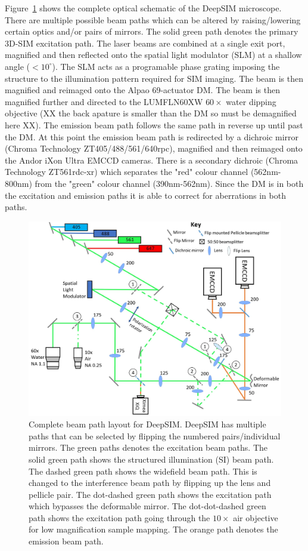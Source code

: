 Figure~\ref{fig:DeepSIM_complete_beam_paths} shows the complete
optical schematic of the DeepSIM microscope. There are multiple
possible beam paths which can be altered by raising/lowering certain
optics and/or pairs of mirrors. The solid green path denotes the
primary 3D-SIM excitation path. The laser beams are combined at a
single exit port, magnified and then reflected onto the spatial light
modulator (SLM) at a shallow angle ($<10^{\circ}$). The SLM acts as a
programable phase grating imposing the structure to the illumination
pattern required for SIM imaging. The beam is then magnified and
reimaged onto the Alpao 69-actuator DM. The beam is then magnified
further and directed to the LUMFLN60XW $60\times$ water dipping
objective (XX the back apature is smaller than the DM so must be
demagnified here XX). The emission beam path follows the same path in
reverse up until past the DM. At this point the emission beam path is redirected by a dichroic mirror (Chroma Technology ZT405/488/561/640rpc), magnified and then reimaged onto the Andor iXon Ultra EMCCD cameras. There is a secondary dichroic (Chroma Technology ZT561rdc-xr) which separates the "red" colour channel (562nm-800nm) from the "green" colour channel (390nm-562nm). Since the DM is in both the excitation and emission paths it is able to correct for aberrations in both paths.

\begin{figure}[h]
	\centering
	\includegraphics[width=\textwidth]{images/DeepSIM_complete_beam_paths.jpg}
	\caption[Complete beam path layout for DeepSIM.]{Complete beam path layout for DeepSIM. DeepSIM has multiple paths that can be selected by flipping the numbered pairs/individual mirrors. The green paths denotes the excitation beam paths. The solid green path shows the structured illumination (SI) beam path. The dashed green path shows the widefield beam path. This is changed to the interference beam path by flipping up the lens and pellicle pair. The dot-dashed green path shows the excitation path which bypasses the deformable mirror. The dot-dot-dashed green path shows the excitation path going through the $10\times$ air objective for low magnification sample mapping. The orange path denotes the emission beam path.}
	\label{fig:DeepSIM_complete_beam_paths}
\end{figure}

